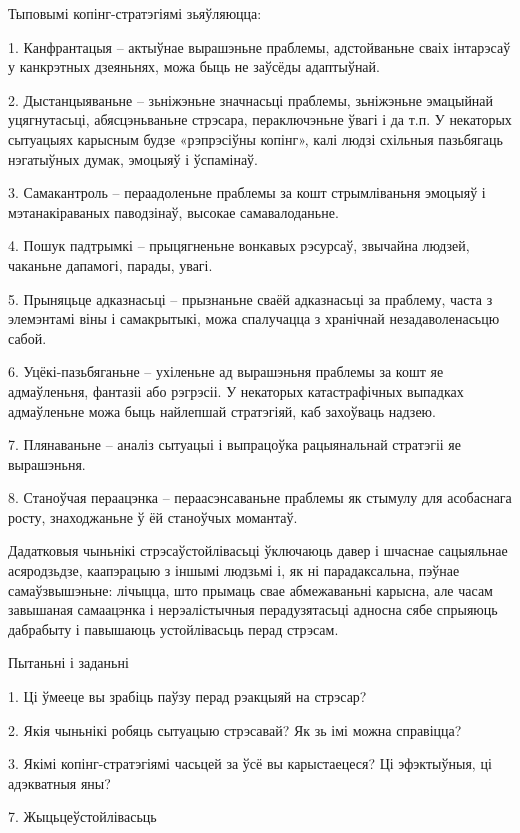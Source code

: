 Тыповымі копінг-стратэгіямі зьяўляюцца:

1. Канфрантацыя – актыўнае вырашэньне праблемы, адстойваньне сваіх інтарэсаў у канкрэтных дзеяньнях, можа быць не заўсёды адаптыўнай.

2. Дыстанцыяваньне – зьніжэньне значнасьці праблемы, зьніжэньне эмацыйнай уцягнутасьці, абясцэньваньне стрэсара, пераключэньне ўвагі і да т.п. У некаторых сытуацыях карысным будзе «рэпрэсіўны копінг», калі людзі схільныя пазьбягаць нэгатыўных думак, эмоцыяў і ўспамінаў.

3. Самакантроль – пераадоленьне праблемы за кошт стрымліваньня эмоцыяў і мэтанакіраваных паводзінаў, высокае самавалоданьне.

4. Пошук падтрымкі – прыцягненьне вонкавых рэсурсаў, звычайна людзей, чаканьне дапамогі, парады, увагі.

5. Прыняцьце адказнасьці – прызнаньне сваёй адказнасьці за праблему, часта з элемэнтамі віны і самакрытыкі, можа спалучацца з хранічнай незадаволенасьцю сабой.

6. Уцёкі-пазьбяганьне – ухіленьне ад вырашэньня праблемы за кошт яе адмаўленьня, фантазіі або рэгрэсіі. У некаторых катастрафічных выпадках адмаўленьне можа быць найлепшай стратэгіяй, каб захоўваць надзею.

7. Плянаваньне – аналіз сытуацыі і выпрацоўка рацыянальнай стратэгіі яе вырашэньня.

8. Станоўчая пераацэнка – пераасэнсаваньне праблемы як стымулу для асобаснага росту, знаходжаньне ў ёй станоўчых момантаў.

Дадатковыя чыньнікі стрэсаўстойлівасьці ўключаюць давер і шчаснае сацыяльнае асяродзьдзе, каапэрацыю з іншымі людзьмі і, як ні парадаксальна, пэўнае самаўзвышэньне: лічыцца, што прымаць свае абмежаваньні карысна, але часам завышаная самаацэнка і нерэалістычныя перадузятасьці адносна сябе спрыяюць дабрабыту і павышаюць устойлівасьць перад стрэсам.

Пытаньні і заданьні

1. Ці ўмееце вы зрабіць паўзу перад рэакцыяй на стрэсар?

2. Якія чыньнікі робяць сытуацыю стрэсавай? Як зь імі можна справіцца?

3. Якімі копінг-стратэгіямі часьцей за ўсё вы карыстаецеся? Ці эфэктыўныя, ці адэкватныя яны?


7. Жыцьцеўстойлівасьць

